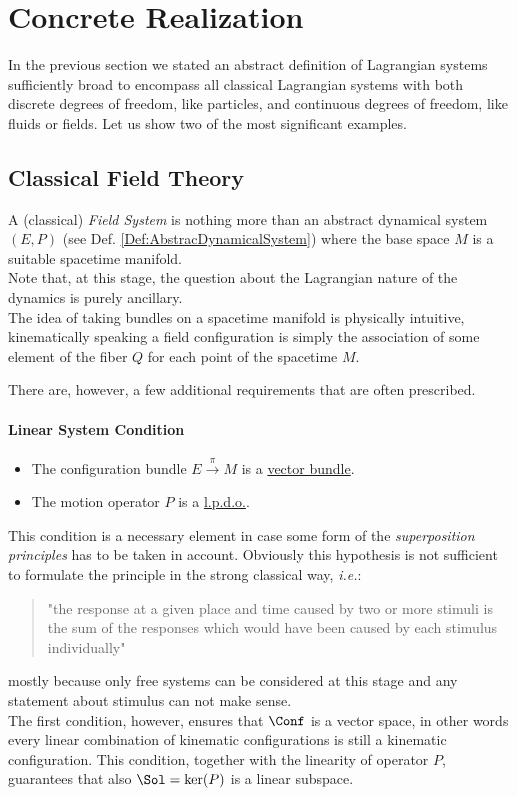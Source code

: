 \documentclass[Main]{subfiles}
\begin{document}
	\section{Concrete Realization}
		In the previous section we stated an abstract definition of Lagrangian systems sufficiently broad to encompass all  classical Lagrangian systems with both discrete degrees of freedom, like particles, and continuous degrees of freedom, like fluids or fields.
	Let us show two of the most significant examples.
	
	
	
		\subsection{Classical Field Theory}\label{Section:CFT}
		A (classical) \emph{Field System} is nothing more than an abstract dynamical system $(E,P)$ (see Def. \ref{Def:AbstracDynamicalSystem}) where the base space $M$  is a suitable spacetime manifold\cite{Bar}. 
		\\
		Note that, at this stage, the question about the Lagrangian nature of the dynamics is purely ancillary.
		\\		
		The idea of taking bundles on a spacetime manifold is physically intuitive, kinematically speaking a field configuration is simply the association of some element of the fiber $Q $ for each point of the spacetime $M$.
		
		There are, however, a few additional requirements that are often prescribed.
		\paragraph{Linear System Condition}		
			\begin{itemize}
				 \item The configuration bundle $E\xrightarrow{\pi} M$ is a \underline{vector bundle}.
				 \item The motion operator $P$ is a \underline{l.p.d.o.}.
			\end{itemize}
			This condition is a necessary element in case some form of the \emph{superposition principles} has to be taken in account. 
			Obviously this hypothesis is not sufficient to formulate the principle in the strong classical way, \textit{i.e.}:
			\begin{quote}
			"the response at a given place and time caused by two or more stimuli is the sum of the responses which would have been caused by each stimulus individually"
			\end{quote} 
			mostly because only free systems can be considered at this stage and any statement about stimulus can not make sense.
			\\
			The first condition, however, ensures that $\Conf$ is a vector space, in other words every linear combination of kinematic configurations is still a kinematic configuration.
			This condition, together with the linearity of operator $P$,  guarantees that also $\Sol= \ker(P)$ is a linear subspace.		
			 
\end{document}
